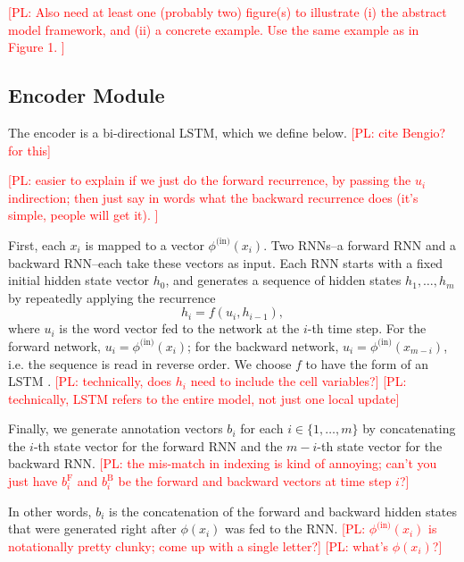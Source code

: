 \documentclass[11pt,letterpaper]{article}
\newcommand{\phiin}{\phi^{\text{(in)}}}
\newcommand\pl[1]{\textcolor{red}{[PL: #1]}}
\begin{document}

\pl{
  Also need at least one (probably two) figure(s)
  to illustrate (i) the abstract model framework,
  and (ii) a concrete example.  Use the same example as in Figure 1.
}

\subsection{Encoder Module}
The encoder is a bi-directional LSTM, which we define below.
\pl{cite Bengio? for this}

\pl{easier to explain if we just do the forward recurrence,
  by passing the $u_i$ indirection;
  then just say in words what the backward recurrence does (it's simple, people will get it).
}

First, each $x_i$ is mapped to a vector $\phiin(x_i)$.
Two RNNs--a forward RNN and a backward RNN--each take these vectors as input.
Each RNN starts with a fixed initial hidden state vector $h_0$, and 
generates a sequence of hidden states $h_1, \dotsc, h_m$ by
repeatedly applying the recurrence \[
  h_i = f(u_i, h_{i-1}),
\]
where $u_i$ is the word vector fed to the network at the $i$-th time step.
For the forward network, $u_i = \phiin(x_i)$; for the
backward network, $u_i = \phiin(x_{m-i})$, i.e. the sequence is read in reverse order.
We choose $f$ to have the form of an LSTM \cite{hochreiter1997lstm}.
\pl{technically, does $h_i$ need to include the cell variables?}
\pl{technically, LSTM refers to the entire model, not just one local update}

Finally, we generate annotation vectors $b_i$ for each 
$i \in \{1, \dotsc, m\}$ by concatenating the 
$i$-th state vector for the forward RNN and 
the $m-i$-th state vector for the backward RNN.  
\pl{the mis-match in indexing is kind of annoying;
can't you just have $b_i^\text{F}$ and $b_i^\text{B}$ be the forward and backward vectors at time step $i$?}

In other words, $b_i$ is the concatenation of the forward
and backward hidden states that were generated
right after $\phi(x_i)$ was fed to the RNN.
\pl{$\phiin(x_i)$ is notationally pretty clunky; come up with a single letter?}
\pl{what's $\phi(x_i)$?}
\end{document}
